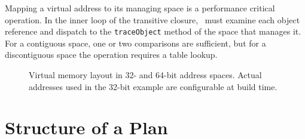Mapping a virtual address to its managing space is a performance critical
operation.  In the inner loop of the transitive closure, \mmtk\ must examine
each object reference and dispatch to the \lstinline|traceObject| method of the
space that manages it.  For a contiguous space, one or two comparisons are
sufficient, but for a discontiguous space the operation requires a table lookup.

\begin{figure}[htb]
\vspace*{2ex}
\begin{minipage}{.45\textwidth}

\end{minipage}
\hfill
\begin{minipage}{.45\textwidth}

\end{minipage}
\caption{Virtual memory layout in 32- and 64-bit address spaces.  Actual
addresses used in the 32-bit example are configurable at build time.}
\label{fig:vm}
\end{figure}

\section{Structure of a Plan}

